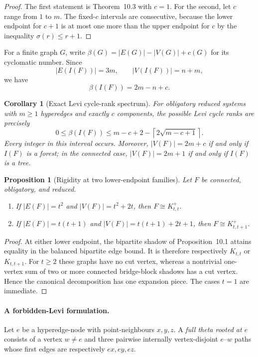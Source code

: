 \documentclass[a4paper,11pt,reqno]{amsart}
\theoremstyle{plain}
\newtheorem{proposition}[theorem]{Proposition}
\newtheorem{corollary}[theorem]{Corollary}
\theoremstyle{definition}
\theoremstyle{remark}
\begin{document}
\begin{proof}
The first statement is Theorem~10.3 with $c=1$.  For the second, let $c$ range
from $1$ to $m$.  The fixed-$c$ intervals are consecutive, because the lower
endpoint for $c+1$ is at most one more than the upper endpoint for $c$ by the
inequality $\sigma(r)\le r+1$.
\end{proof}

For a finite graph $G$, write
$\beta(G)=|E(G)|-|V(G)|+c(G)$ for its cyclomatic number.  Since
\[
|E(I(F))|=3m,
\qquad
|V(I(F))|=n+m,
\]
we have
\[
\beta(I(F))=2m-n+c.
\tag{10.10}
\]

\begin{corollary}[Exact Levi cycle-rank spectrum]\label{corollary-10.5-cycle-rank-spectrum}
For obligatory reduced systems with $m\ge1$ hyperedges and exactly $c$
components, the possible Levi cycle ranks are precisely
\[
\boxed{
0\le\beta(I(F))
\le m-c+2-\left\lceil2\sqrt{m-c+1}\right\rceil.
}
\tag{10.11}
\]
Every integer in this interval occurs.  Moreover,
$|V(F)|=2m+c$ if and only if $I(F)$ is a forest; in the connected case,
$|V(F)|=2m+1$ if and only if $I(F)$ is a tree.
\end{corollary}

\begin{proposition}[Rigidity at two lower-endpoint families]\label{proposition-10.6-lower-endpoint-rigidity}
Let $F$ be connected, obligatory, and reduced.
\begin{enumerate}
\item If $|E(F)|=t^2$ and $|V(F)|=t^2+2t$, then
$F\cong K_{t,t}^+$.
\item If $|E(F)|=t(t+1)$ and $|V(F)|=t(t+1)+2t+1$, then
$F\cong K_{t,t+1}^+$.
\end{enumerate}
\end{proposition}

\begin{proof}
At either lower endpoint, the bipartite shadow of Proposition~10.1 attains
equality in the balanced bipartite edge bound.  It is therefore respectively
$K_{t,t}$ or $K_{t,t+1}$.  For $t\ge2$ these graphs have no cut vertex, whereas
a nontrivial one-vertex sum of two or more connected bridge-block shadows has
a cut vertex.  Hence the canonical decomposition has one expansion piece.
The cases $t=1$ are immediate.
\end{proof}

\paragraph{A forbidden-Levi formulation.}
Let $e$ be a hyperedge-node with point-neighbours $x,y,z$.  A \emph{full theta
rooted at $e$} consists of a vertex $w\ne e$ and three pairwise internally
vertex-disjoint $e$--$w$ paths whose first edges are respectively $ex,ey,ez$.
\end{document}
